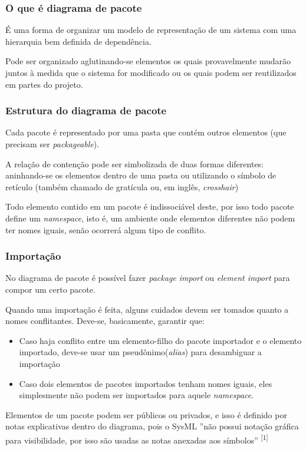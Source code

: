 \subsubsection{O que é diagrama de pacote}
É uma forma de organizar um modelo de representação de um sistema com uma hierarquia bem definida de dependência.

Pode ser organizado aglutinando-se elementos os quais provavelmente mudarão juntos à medida que o sistema for modificado ou os quais podem ser reutilizados em partes do projeto. 

\subsubsection{Estrutura do diagrama de pacote}
Cada pacote é representado por uma pasta que contém outros elementos (que precisam ser \textit{packageable}).

A relação de contenção pode ser simbolizada de duas formas diferentes: aninhando-se os elementos dentro de uma pasta ou utilizando o símbolo de retículo (também chamado de gratícula ou, em inglês, \textit{crosshair})

Todo elemento contido em um pacote é indissociável deste, por isso todo pacote define um \textit{namespace}, isto é, um ambiente onde elementos diferentes não podem ter nomes iguais, senão ocorrerá algum tipo de conflito.

\subsubsection{Importação}
No diagrama de pacote é possível fazer \textit{package import} ou \textit{element import} para compor um certo pacote.

Quando uma importação é feita, alguns cuidados devem ser tomados quanto a nomes conflitantes. Deve-se, basicamente, garantir que: 

\begin{itemize}
    \item Caso haja conflito entre um elemento-filho do pacote importador e o elemento importado, deve-se usar um pseudônimo(\textit{alias}) para desambiguar a importação
    
    \item Caso dois elementos de pacotes importados tenham nomes iguais, eles simplesmente não podem ser importados para aquele \textit{namespace}.
\end{itemize}

Elementos de um pacote podem ser públicos ou privados, e isso é definido por notas explicativas dentro do diagrama, pois o SysML ''não possui notação gráfica para visibilidade, por isso são usadas as notas anexadas aos símbolos'' \textsuperscript{[1]}

